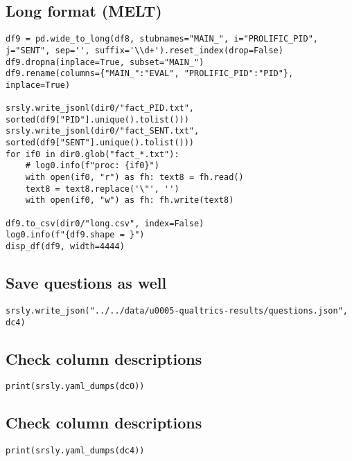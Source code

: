 \documentclass[a4paper,10pt,onecolumn,oneside,openright]{article}
\begin{document}
\subsection{Long format (MELT)}
\label{sec:org6c80858}
\begin{verbatim}
df9 = pd.wide_to_long(df8, stubnames="MAIN_", i="PROLIFIC_PID", j="SENT", sep='', suffix='\\d+').reset_index(drop=False)
df9.dropna(inplace=True, subset="MAIN_")
df9.rename(columns={"MAIN_":"EVAL", "PROLIFIC_PID":"PID"}, inplace=True)

srsly.write_jsonl(dir0/"fact_PID.txt", sorted(df9["PID"].unique().tolist()))
srsly.write_jsonl(dir0/"fact_SENT.txt", sorted(df9["SENT"].unique().tolist()))
for if0 in dir0.glob("fact_*.txt"):
    # log0.info(f"proc: {if0}")
    with open(if0, "r") as fh: text8 = fh.read()
    text8 = text8.replace('\"', '')
    with open(if0, "w") as fh: fh.write(text8)

df9.to_csv(dir0/"long.csv", index=False)
log0.info(f"{df9.shape = }")
disp_df(df9, width=4444)
\end{verbatim}

\subsection{Save questions as well}
\label{sec:org228ace4}
\begin{verbatim}
srsly.write_json("../../data/u0005-qualtrics-results/questions.json", dc4)

\end{verbatim}

\subsection{Check column descriptions}
\label{sec:org2532ea1}
\begin{verbatim}
print(srsly.yaml_dumps(dc0))

\end{verbatim}
\subsection{Check column descriptions}
\label{sec:orge8f1165}
\begin{verbatim}
print(srsly.yaml_dumps(dc4))
\end{verbatim}
\end{document}
